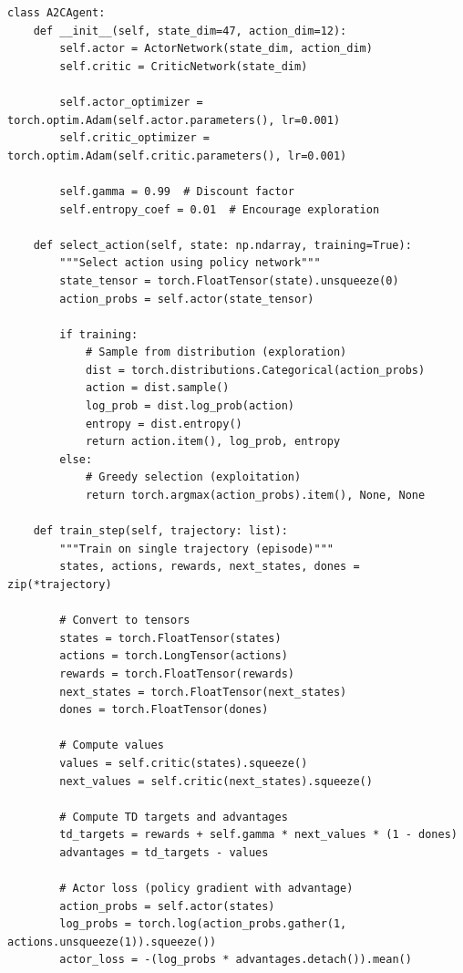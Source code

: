 \begin{lstlisting}[style=pythonstyle]
class A2CAgent:
    def __init__(self, state_dim=47, action_dim=12):
        self.actor = ActorNetwork(state_dim, action_dim)
        self.critic = CriticNetwork(state_dim)
        
        self.actor_optimizer = torch.optim.Adam(self.actor.parameters(), lr=0.001)
        self.critic_optimizer = torch.optim.Adam(self.critic.parameters(), lr=0.001)
        
        self.gamma = 0.99  # Discount factor
        self.entropy_coef = 0.01  # Encourage exploration
    
    def select_action(self, state: np.ndarray, training=True):
        """Select action using policy network"""
        state_tensor = torch.FloatTensor(state).unsqueeze(0)
        action_probs = self.actor(state_tensor)
        
        if training:
            # Sample from distribution (exploration)
            dist = torch.distributions.Categorical(action_probs)
            action = dist.sample()
            log_prob = dist.log_prob(action)
            entropy = dist.entropy()
            return action.item(), log_prob, entropy
        else:
            # Greedy selection (exploitation)
            return torch.argmax(action_probs).item(), None, None
    
    def train_step(self, trajectory: list):
        """Train on single trajectory (episode)"""
        states, actions, rewards, next_states, dones = zip(*trajectory)
        
        # Convert to tensors
        states = torch.FloatTensor(states)
        actions = torch.LongTensor(actions)
        rewards = torch.FloatTensor(rewards)
        next_states = torch.FloatTensor(next_states)
        dones = torch.FloatTensor(dones)
        
        # Compute values
        values = self.critic(states).squeeze()
        next_values = self.critic(next_states).squeeze()
        
        # Compute TD targets and advantages
        td_targets = rewards + self.gamma * next_values * (1 - dones)
        advantages = td_targets - values
        
        # Actor loss (policy gradient with advantage)
        action_probs = self.actor(states)
        log_probs = torch.log(action_probs.gather(1, actions.unsqueeze(1)).squeeze())
        actor_loss = -(log_probs * advantages.detach()).mean()
        

\end{lstlisting}
